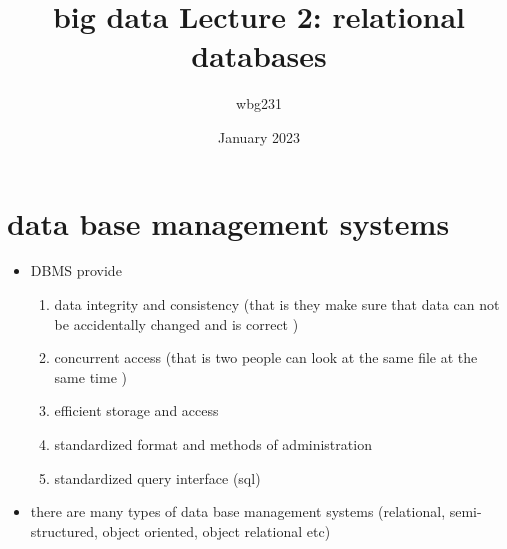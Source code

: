 \documentclass{article}
\title{big data Lecture 2: relational databases}
\author{wbg231 }
\date{January 2023}
\begin{document}
\maketitle

\section{data base management systems}
\begin{itemize}
    
\item DBMS provide
\begin{enumerate}

    \item data integrity and consistency (that is they make sure that data can not be accidentally changed and is correct )
   
    \item concurrent access (that is two people can look at the same file at the same time )
    \item efficient storage and access 
    \item standardized format and methods of administration 
    \item standardized query interface (sql)
\end{enumerate}
\item there are many types of data base management systems (relational, semi-structured, object oriented, object relational etc)

\end{itemize}
\end{document}

